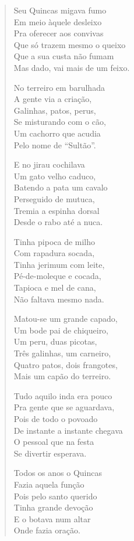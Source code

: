 \begin{verse}
Seu Quincas migava fumo\\
Em meio àquele desleixo\\
Pra oferecer aos convivas\\
Que só trazem mesmo o queixo\\
Que a sua custa não fumam\\
Mas dado, vai mais de um feixo.

No terreiro em barulhada\\
A gente via a criação,\\
Galinhas, patos, perus,\\
Se misturando com o cão,\\
Um cachorro que acudia\\
Pelo nome de “Sultão”.

E no jirau cochilava\\
Um gato velho caduco,\\
Batendo a pata um cavalo\\
Perseguido de mutuca,\\
Tremia a espinha dorsal\\
Desde o rabo até a nuca.

Tinha pipoca de milho\\
Com rapadura socada, \\
Tinha jerimum com leite,\\
Pé-de-moleque e cocada,\\
Tapioca e mel de cana,\\
Não faltava mesmo nada.


Matou-se um grande capado,\\
Um bode pai de chiqueiro, \\
Um peru, duas picotas,\\
Três galinhas, um carneiro,\\
Quatro patos, dois frangotes,\\
Mais um capão do terreiro.

Tudo aquilo inda era pouco\\
Pra gente que se aguardava,\\
Pois de todo o povoado\\
De instante a instante chegava\\
O pessoal que na festa\\
Se divertir esperava.

Todos os anos o Quincas\\
Fazia aquela função\\
Pois pelo santo querido\\
Tinha grande devoção\\
E o botava num altar\\
Onde fazia oração.


\end{verse}
